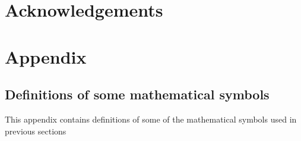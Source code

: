 \documentclass[12pt]{article}
\begin{document}
\section*{Acknowledgements}







\clearpage
\newpage
\section{Appendix}

\subsection{Definitions of some mathematical symbols}
\label{Appendix:DefinitionsOfMathematicalSymbols}

This appendix contains definitions of some of the mathematical symbols used in previous sections
\end{document}

